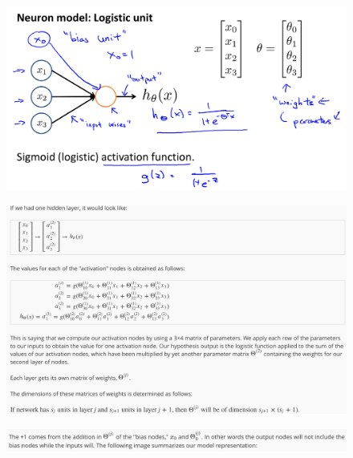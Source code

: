 \documentclass[12pt, A4,onecolumn]{article} %
\begin{document}
\begin{figure}[H]
	\centering
	\includegraphics[width=1\textwidth]{./ImagenesW4/neuroModel1}
\end{figure}

\begin{figure}[H]
	\centering
	\includegraphics[width=1\textwidth]{./ImagenesW4/modelRep2}
\end{figure}

\begin{figure}[H]
	\centering
	\includegraphics[width=1\textwidth]{./ImagenesW4/modelRep3}
\end{figure}
\end{document}
